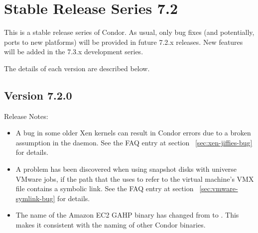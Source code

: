 
\section{\label{sec:History-7-2}Stable Release Series 7.2}

This is a stable release series of Condor.
As usual, only bug fixes (and potentially, ports to new platforms)
will be provided in future 7.2.x releases.
New features will be added in the 7.3.x development series.

The details of each version are described below.


\subsection*{\label{sec:New-7-2-0}Version 7.2.0}

\noindent Release Notes:

\begin{itemize}

\item A bug in some older Xen kernels can result in Condor errors
due to a broken assumption in the  daemon.
See the FAQ entry at section~ \ref{sec:xen-jiffies-bug} for details.

\item A problem has been discovered when using snapshot disks with 
 universe VMware jobs,
if the path that the  uses to refer to the
virtual machine's VMX file contains a symbolic link.
See the FAQ entry at section~ \ref{sec:vmware-symlink-bug} for details.

\item The name of the Amazon EC2 GAHP binary has changed from
 to . This makes it consistent
with the naming of other Condor binaries.

\end{itemize}


